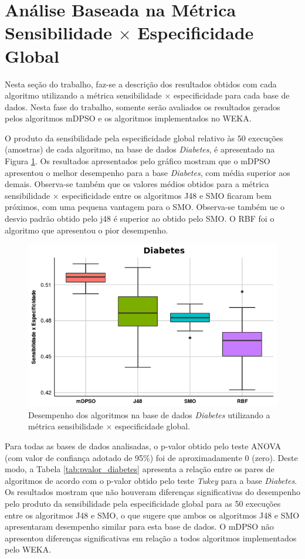 \documentclass[
	12pt,				%
	openany,			%
	oneside,	
	a4paper,			%
	brazil,				%
	]{unimontes-ppgmsc-abntex2}
\begin{document}
\section{Análise Baseada na Métrica Sensibilidade $\times$ Especificidade Global}
\label{sec:mdpso_analise2}

Nesta seção do trabalho, faz-se a descrição dos resultados obtidos com cada algoritmo utilizando a métrica sensibilidade $\times$ especificidade para cada base de dados. Nesta fase do trabalho, somente serão avaliados os resultados gerados pelos algoritmos mDPSO e os algoritmos implementados no WEKA. 

O produto da sensibilidade pela especificidade global relativo às 50 execuções (amostras) de cada algoritmo, na base de dados {\em Diabetes}, é apresentado na Figura \ref{fig:diabetes}. Os resultados apresentados pelo gráfico mostram que o mDPSO apresentou o melhor desempenho para a base {\em Diabetes}, com média superior aos demais. Observa-se também que os valores médios obtidos para a métrica sensibilidade $\times$ especificidade entre os algoritmos J48 e SMO ficaram bem próximos, com uma pequena vantagem para o SMO. Observa-se também ue o desvio padrão obtido pelo j48 é superior ao obtido pelo SMO. O RBF foi o algoritmo que apresentou o pior desempenho.

\begin{figure}[!ht]
\centering
\includegraphics[scale=.7]{graficos/diabetes}
\caption{Desempenho dos algoritmos na base de dados {\em Diabetes} utilizando a métrica sensibilidade $\times$ especificidade global.}
\label{fig:diabetes}
\end{figure}

Para todas as bases de dados analisadas, o p-valor obtido pelo teste ANOVA (com valor de confiança adotado de 95\%) foi de aproximadamente 0 (zero). Deste modo, a Tabela \ref{tab:pvalor_diabetes} apresenta a relação entre os pares de algoritmos de acordo com o p-valor obtido pelo teste {\em Tukey} para a base {\em Diabetes}. Os resultados mostram que não houveram diferenças significativas do desempenho pelo produto da sensibilidade pela especificidade global para as 50 execuções entre os algoritmos J48 e SMO, o que sugere que ambos os algoritmos J48 e SMO apresentaram desempenho similar para esta base de dados. O mDPSO não apresentou diferenças significativas em relação a todos algoritmos implementados pelo WEKA. 
\end{document}
